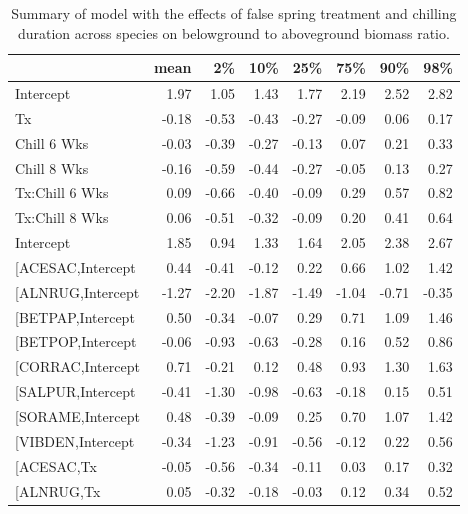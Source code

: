 \documentclass{article}\usepackage[]{graphicx}\usepackage[]{color}
\makeatletter
\newenvironment{kframe}{%
 \def\at@end@of@kframe{}%
 \ifinner\ifhmode%
  \def\at@end@of@kframe{\end{minipage}}%
  \begin{minipage}{\columnwidth}%
 \fi\fi%
 \def\FrameCommand##1{\hskip\@totalleftmargin \hskip-\fboxsep
 \colorbox{shadecolor}{##1}\hskip-\fboxsep
     \hskip-\linewidth \hskip-\@totalleftmargin \hskip\columnwidth}%
 \MakeFramed {\advance\hsize-\width
   \@totalleftmargin\z@ \linewidth\hsize
   \@setminipage}}%
 {\par\unskip\endMakeFramed%
 \at@end@of@kframe}
\makeatother
\begin{document}
\newpage
\begin{kframe}


{\ttfamily\noindent\bfseries\color{errorcolor}{\#\# Error in gsub("{}["{}, "{}"{}, modoutput\$term): invalid regular expression '[', reason 'Missing ']''}}\end{kframe}%
\begin{longtable}{lrrrrrrr}
\caption{Summary of model with the effects of false spring treatment and chilling duration across species on belowground to aboveground biomass ratio.} \\ 
  \hline
 & mean & 2\% & 10\% & 25\% & 75\% & 90\% & 98\% \\ 
  \hline \endhead  \hline
Intercept & 1.97 & 1.05 & 1.43 & 1.77 & 2.19 & 2.52 & 2.82 \\ 
  Tx & -0.18 & -0.53 & -0.43 & -0.27 & -0.09 & 0.06 & 0.17 \\ 
  Chill 6 Wks & -0.03 & -0.39 & -0.27 & -0.13 & 0.07 & 0.21 & 0.33 \\ 
  Chill 8 Wks & -0.16 & -0.59 & -0.44 & -0.27 & -0.05 & 0.13 & 0.27 \\ 
  Tx:Chill 6 Wks & 0.09 & -0.66 & -0.40 & -0.09 & 0.29 & 0.57 & 0.82 \\ 
  Tx:Chill 8 Wks & 0.06 & -0.51 & -0.32 & -0.09 & 0.20 & 0.41 & 0.64 \\ 
  Intercept & 1.85 & 0.94 & 1.33 & 1.64 & 2.05 & 2.38 & 2.67 \\ 
  [ACESAC,Intercept & 0.44 & -0.41 & -0.12 & 0.22 & 0.66 & 1.02 & 1.42 \\ 
  [ALNRUG,Intercept & -1.27 & -2.20 & -1.87 & -1.49 & -1.04 & -0.71 & -0.35 \\ 
  [BETPAP,Intercept & 0.50 & -0.34 & -0.07 & 0.29 & 0.71 & 1.09 & 1.46 \\ 
  [BETPOP,Intercept & -0.06 & -0.93 & -0.63 & -0.28 & 0.16 & 0.52 & 0.86 \\ 
  [CORRAC,Intercept & 0.71 & -0.21 & 0.12 & 0.48 & 0.93 & 1.30 & 1.63 \\ 
  [SALPUR,Intercept & -0.41 & -1.30 & -0.98 & -0.63 & -0.18 & 0.15 & 0.51 \\ 
  [SORAME,Intercept & 0.48 & -0.39 & -0.09 & 0.25 & 0.70 & 1.07 & 1.42 \\ 
  [VIBDEN,Intercept & -0.34 & -1.23 & -0.91 & -0.56 & -0.12 & 0.22 & 0.56 \\ 
  [ACESAC,Tx & -0.05 & -0.56 & -0.34 & -0.11 & 0.03 & 0.17 & 0.32 \\ 
  [ALNRUG,Tx & 0.05 & -0.32 & -0.18 & -0.03 & 0.12 & 0.34 & 0.52 \\ 

\end{longtable}
\end{document}
